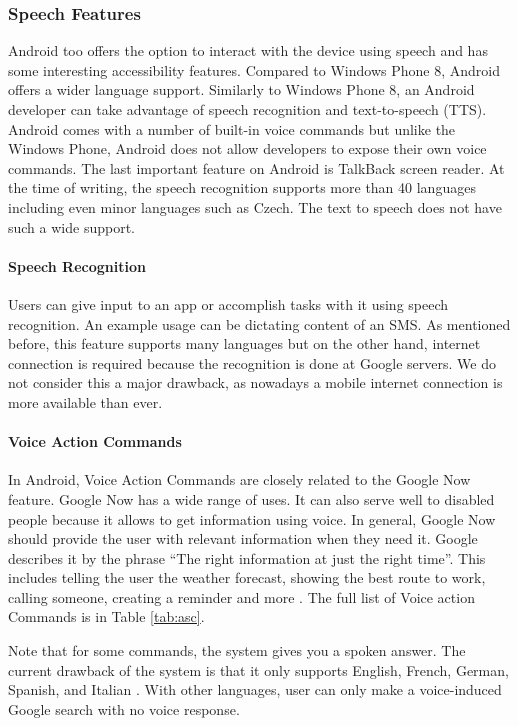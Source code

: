 \subsubsection{Speech Features}
Android too offers the option to interact with the device using speech and has some interesting accessibility features. Compared to Windows Phone 8, Android offers a wider language support. Similarly to Windows Phone 8, an Android developer can take advantage of speech recognition and text-to-speech (TTS). Android comes with a number of built-in voice commands but unlike the Windows Phone, Android does not allow developers to expose their own voice commands. The last important feature on Android is TalkBack screen reader.
At the time of writing, the speech recognition supports more than 40 languages including even minor languages such as Czech. The text to speech does not have such a wide support.

\paragraph{Speech Recognition}
Users can give input to an app or accomplish tasks with it using speech recognition. An example usage can be dictating content of an SMS. As mentioned before, this feature supports many languages but on the other hand, internet connection is required \cite{androidRecog} because the recognition is done at Google servers. We do not consider this a major drawback, as nowadays a mobile internet connection is more available than ever.

\paragraph{Voice Action Commands}
In Android, Voice Action Commands are closely related to the Google Now feature. Google Now has a wide range of uses. It can also serve well to disabled people because it allows to get information using voice.
In general, Google Now should provide the user with relevant information when they need it. Google describes it by the phrase “The right information at just the right time”. This includes telling the user the weather forecast, showing the best route to work, calling someone, creating a reminder and more \cite{googleNow}. The full list of Voice action Commands is in Table \ref{tab:asc}.

Note that for some commands, the system gives you a spoken answer. The current drawback of the system is that it only supports English, French, German, Spanish, and Italian \cite{androidTTS}. With other languages, user can only make a voice-induced Google search with no voice response.

